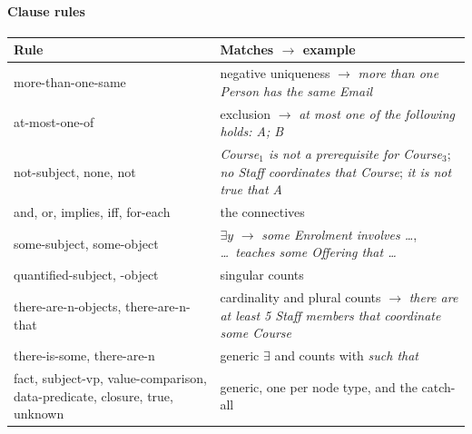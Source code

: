 \documentclass[11pt, a4paper]{article}
\begin{document}
\paragraph{Clause rules}
\begin{center}
\small
\begin{tabularx}{\textwidth}{>{\raggedright\arraybackslash\leavevmode\ttfamily\color{codefg}}p{} X}
\toprule
\normalfont\textbf{Rule} & \textbf{Matches $\to$ example} \\
\midrule
more-than-one-same & negative uniqueness $\to$ \textit{more than one Person has the same Email} \\
at-most-one-of & exclusion $\to$ \textit{at most one of the following holds: A; B} \\
not-subject, none, not & \textit{Course$_1$ is not a prerequisite for Course$_3$}; \textit{no Staff coordinates that Course}; \textit{it is not true that A} \\
and, or, implies, iff, for-each & the connectives \\
some-subject, some-object & $\exists y$ $\to$ \textit{some Enrolment involves \ldots}, \textit{\ldots\ teaches some Offering that \ldots} \\
quantified-subject, -object & singular counts \\
there-are-n-objects, there-are-n-that & cardinality and plural counts $\to$ \textit{there are at least 5 Staff members that coordinate some Course} \\
there-is-some, there-are-n & generic $\exists$ and counts with \textit{such that} \\
fact, subject-vp, value-comparison, data-\-predicate, closure, true, unknown & generic, one per node type, and the catch-all \\
\bottomrule
\end{tabularx}
\end{center}

\end{document}
